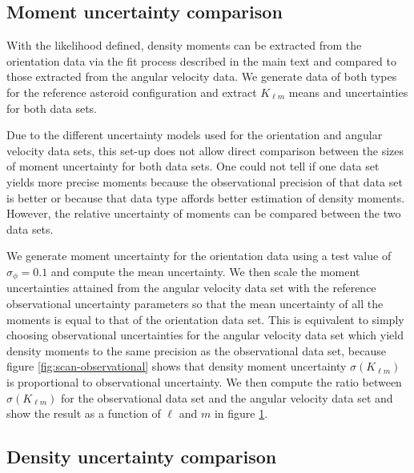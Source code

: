 \subsection{Moment uncertainty comparison}
With the likelihood defined, density moments can be extracted from the orientation data via the fit process described in the main text and compared to those extracted from the angular velocity data. We generate data of both types for the reference asteroid configuration and extract $K_{\ell m}$ means and uncertainties for both data sets.

Due to the different uncertainty models used for the orientation and angular velocity data sets, this set-up does not allow direct comparison between the sizes of moment uncertainty for both data sets. One could not tell if one data set yields more precise moments because the observational precision of that data set is better or because that data type affords better estimation of density moments. However, the relative uncertainty of moments can be compared between the two data sets. 

We generate moment uncertainty for the orientation data using a test value of $\sigma_\phi = 0.1$ and compute the mean uncertainty. We then scale the moment uncertainties attained from the angular velocity data set with the reference observational uncertainty parameters so that the mean uncertainty of all the moments is equal to that of the orientation data set. This is equivalent to simply choosing observational uncertainties for the angular velocity data set which yield density moments to the same precision as the observational data set, because figure \ref{fig:scan-observational} shows that density moment uncertainty $\sigma(K_{\ell m})$ is proportional to observational uncertainty. We then compute the ratio between $\sigma(K_{\ell m})$ for the observational data set and the angular velocity data set and show the result as a function of $\ell$ and $m$ in figure \ref{fig:observational-moment-uncertainty}.
\begin{figure}
  \centering
  \caption{}
  \label{fig:observational-moment-uncertainty}
\end{figure}

\subsection{Density uncertainty comparison}



